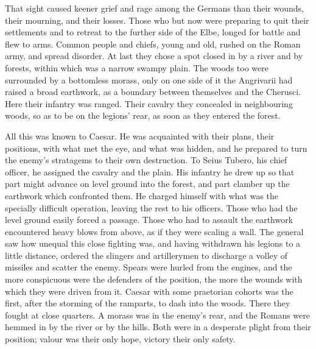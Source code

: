 That sight caused keener grief and rage among the Germans than their wounds, their mourning, and their losses. Those who but now were preparing to quit their settlements and to retreat to the further side of the Elbe, longed for battle and flew to arms. Common people and chiefs, young and old, rushed on the Roman army, and spread disorder. At last they chose a spot closed in by a river and by forests, within which was a narrow swampy plain. The woods too were surrounded by a bottomless morass, only on one side of it the Angrivarii had raised a broad earthwork, as a boundary between themselves and the Cherusci. Here their infantry was ranged. Their cavalry they concealed in neighbouring woods, so as to be on the legions' rear, as soon as they entered the forest.


All this was known to Caesar. He was acquainted with their plans, their positions, with what met the eye, and what was hidden, and he prepared to turn the enemy's stratagems to their own destruction. To Seius Tubero, his chief officer, he assigned the cavalry and the plain. His infantry he drew up so that part might advance on level ground into the forest, and part clamber up the earthwork which confronted them. He charged himself with what was the specially difficult operation, leaving the rest to his officers. Those who had the level ground easily forced a passage. Those who had to assault the earthwork encountered heavy blows from above, as if they were scaling a wall. The general saw how unequal this close fighting was, and having withdrawn his legions to a little distance, ordered the slingers and artillerymen to discharge a volley of missiles and scatter the enemy. Spears were hurled from the engines, and the more conspicuous were the defenders of the position, the more the wounds with which they were driven from it. Caesar with some praetorian cohorts was the first, after the storming of the ramparts, to dash into the woods. There they fought at close quarters. A morass was in the enemy's rear, and the Romans were hemmed in by the river or by the hills. Both were in a desperate plight from their position; valour was their only hope, victory their only safety.


